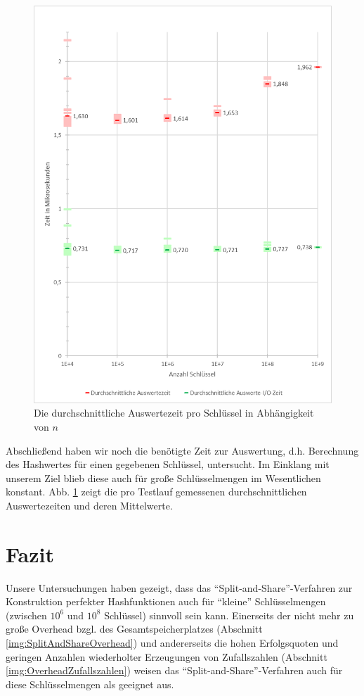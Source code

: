 \documentclass[a4paper,12pt,twoside]{report}
\begin{document}
\begin{figure}[tbhp]
\centering
\includegraphics[width=\textwidth]{diagrams/Auswertezeit.png} 
\caption{Die durchschnittliche Auswertezeit pro Schlüssel in Abhängigkeit von $n$}
\label{img:Auswertezeit}
\end{figure}
Abschließend haben wir noch die benötigte Zeit zur Auswertung, d.h. Berechnung des Hashwertes für einen gegebenen Schlüssel, untersucht.
Im Einklang mit unserem Ziel blieb diese auch für große Schlüsselmengen im Wesentlichen konstant.
Abb. \ref{img:Auswertezeit} zeigt die pro Testlauf gemessenen durchschnittlichen Auswertezeiten und deren Mittelwerte.

\chapter{Fazit}
\label{cha:fazit}

Unsere Untersuchungen haben gezeigt, dass das ``Split-and-Share''-Verfahren zur Konstruktion perfekter Hashfunktionen auch für ``kleine'' Schlüsselmengen (zwischen $10^6$ und $10^8$ Schlüssel) sinnvoll sein kann.
Einerseits der nicht mehr zu große Overhead bzgl. des Gesamtspeicherplatzes (Abschnitt \ref{img:SplitAndShareOverhead}) und andererseits die hohen Erfolgsquoten und geringen Anzahlen wiederholter Erzeugungen von Zufallszahlen (Abschnitt \ref{img:OverheadZufallszahlen}) weisen das ``Split-and-Share''-Verfahren auch für diese Schlüsselmengen als geeignet aus.
\end{document}
